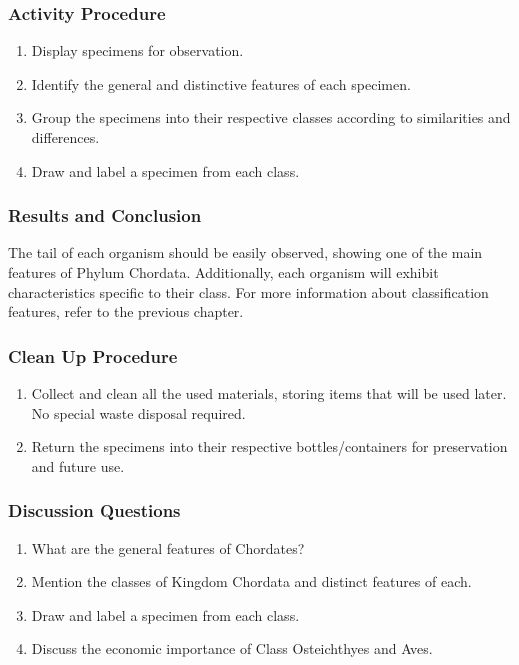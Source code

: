 \subsubsection*{Activity Procedure}
\begin{enumerate}
\item{Display specimens for observation.}
\item{Identify the general and distinctive features of each specimen.}
\item{Group the specimens into their respective classes according to similarities and differences.}
\item{Draw and label a specimen from each class.}
\end{enumerate}

\subsubsection*{Results and Conclusion}
The tail of each organism should be easily observed, showing one of the main features of Phylum Chordata. Additionally, each organism will exhibit characteristics specific to their class. For more information about classification features, refer to the previous chapter.

\subsubsection*{Clean Up Procedure}
\begin{enumerate}
\item{Collect and clean all the used materials, storing items that will be used later. No special waste disposal required.}
\item{Return the specimens into their respective bottles/containers for preservation and future use.}
\end{enumerate}

\subsubsection*{Discussion Questions}
\begin{enumerate}
\item{What are the general features of Chordates?}
\item{Mention the classes of Kingdom Chordata and distinct features of each.}
\item{Draw and label a specimen from each class.}
\item{Discuss the economic importance of Class Osteichthyes and Aves.}
\end{enumerate}


